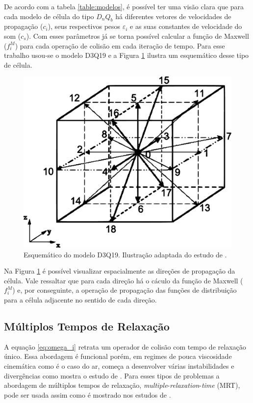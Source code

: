 De acordo com a tabela \ref{table:modelos}, é possível ter uma visão clara que para cada modelo de célula do tipo $D_{n}Q_{b}$ há diferentes vetores de velocidades de propagação ($c_{i}$), seus respectivos pesos $\varepsilon_{i}$ e as suas constantes de velocidade do som ($c_{s}$). Com esses parâmetros já se torna possível calcular a função de Maxwell ($f_{i}^{M}$) para cada operação de colisão em cada iteração de tempo. Para esse trabalho usou-se o modelo D3Q19 e a Figura \ref{fig:d3q19} ilustra um esquemático desse tipo de célula.

\begin{figure}[ht!]
\centering
  \includegraphics[width=.8\linewidth]{figuras/d3q19.pdf}
  \caption[Esquemático do D3Q19]{Esquemático do modelo D3Q19. Ilustração adaptada do estudo de .}
  \label{fig:d3q19}
\end{figure}

Na Figura \ref{fig:d3q19} é possível visualizar espacialmente as direções de propagação da célula. Vale ressaltar que para cada direção há o cáculo da função de Maxwell ($f_{i}^{M}$) e, por conseguinte, a operação de propagação das funções de distribuição para a célula adjacente no sentido de cada direção.

\subsection{Múltiplos Tempos de Relaxação}

A equação \ref{eq:omega_i} retrata um operador de colisão com tempo de relaxação único. Essa abordagem é funcional porém, em regimes de pouca viscosidade cinemática como é o caso do ar, começa a desenvolver várias instabilidades e divergências como mostra o estudo de . Para esses tipos de problemas a abordagem de múltiplos tempos de relaxação, \textit{multiple}-\textit{relaxation}-\textit{time} (MRT), pode ser usada assim como é mostrado nos estudos de .

